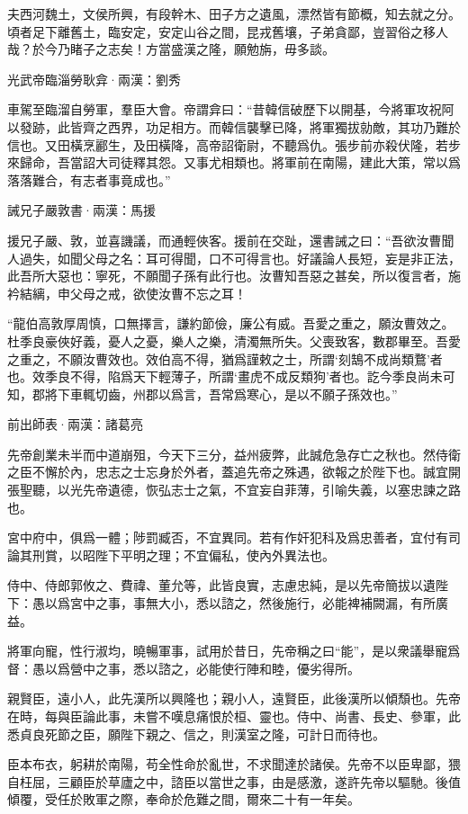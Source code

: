 \documentclass[12pt,a4paper]{ctexbook}
\begin{document}
夫西河魏土，文侯所興，有段幹木、田子方之遺風，漂然皆有節概，知去就之分。頃者足下離舊土，臨安定，安定山谷之間，昆戎舊壤，子弟貪鄙，豈習俗之移人哉？於今乃睹子之志矣！方當盛漢之隆，願勉旃，毋多談。\par
光武帝臨淄勞耿弇·兩漢：劉秀 \par
車駕至臨溜自勞軍，羣臣大會。帝謂弇曰：“昔韓信破歷下以開基，今將軍攻祝阿以發跡，此皆齊之西界，功足相方。而韓信襲擊已降，將軍獨拔勍敵，其功乃難於信也。又田橫烹酈生，及田橫降，高帝詔衛尉，不聽爲仇。張步前亦殺伏隆，若步來歸命，吾當詔大司徒釋其怨。又事尤相類也。將軍前在南陽，建此大策，常以爲落落難合，有志者事竟成也。”\par
誡兄子嚴敦書·兩漢：馬援 \par
援兄子嚴、敦，並喜譏議，而通輕俠客。援前在交趾，還書誡之曰：“吾欲汝曹聞人過失，如聞父母之名：耳可得聞，口不可得言也。好議論人長短，妄是非正法，此吾所大惡也：寧死，不願聞子孫有此行也。汝曹知吾惡之甚矣，所以復言者，施衿結縭，申父母之戒，欲使汝曹不忘之耳！\par
“龍伯高敦厚周慎，口無擇言，謙約節儉，廉公有威。吾愛之重之，願汝曹效之。杜季良豪俠好義，憂人之憂，樂人之樂，清濁無所失。父喪致客，數郡畢至。吾愛之重之，不願汝曹效也。效伯高不得，猶爲謹敕之士，所謂‘刻鵠不成尚類鶩’者也。效季良不得，陷爲天下輕薄子，所謂‘畫虎不成反類狗’者也。訖今季良尚未可知，郡將下車輒切齒，州郡以爲言，吾常爲寒心，是以不願子孫效也。”\par
前出師表·兩漢：諸葛亮 \par
先帝創業未半而中道崩殂，今天下三分，益州疲弊，此誠危急存亡之秋也。然侍衛之臣不懈於內，忠志之士忘身於外者，蓋追先帝之殊遇，欲報之於陛下也。誠宜開張聖聽，以光先帝遺德，恢弘志士之氣，不宜妄自菲薄，引喻失義，以塞忠諫之路也。\par
宮中府中，俱爲一體；陟罰臧否，不宜異同。若有作奸犯科及爲忠善者，宜付有司論其刑賞，以昭陛下平明之理；不宜偏私，使內外異法也。\par
侍中、侍郎郭攸之、費禕、董允等，此皆良實，志慮忠純，是以先帝簡拔以遺陛下：愚以爲宮中之事，事無大小，悉以諮之，然後施行，必能裨補闕漏，有所廣益。\par
將軍向寵，性行淑均，曉暢軍事，試用於昔日，先帝稱之曰“能”，是以衆議舉寵爲督：愚以爲營中之事，悉以諮之，必能使行陣和睦，優劣得所。\par
親賢臣，遠小人，此先漢所以興隆也；親小人，遠賢臣，此後漢所以傾頹也。先帝在時，每與臣論此事，未嘗不嘆息痛恨於桓、靈也。侍中、尚書、長史、參軍，此悉貞良死節之臣，願陛下親之、信之，則漢室之隆，可計日而待也。\par
臣本布衣，躬耕於南陽，苟全性命於亂世，不求聞達於諸侯。先帝不以臣卑鄙，猥自枉屈，三顧臣於草廬之中，諮臣以當世之事，由是感激，遂許先帝以驅馳。後值傾覆，受任於敗軍之際，奉命於危難之間，爾來二十有一年矣。\par
\end{document}
